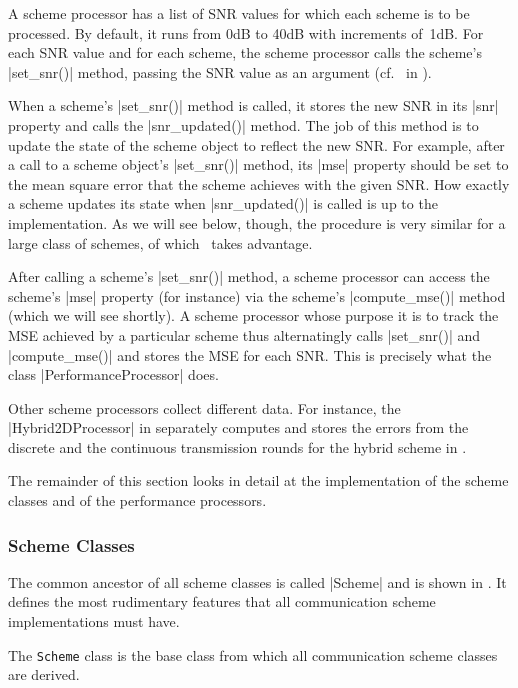 A scheme processor has a list of SNR values for which each scheme is to be
processed. By default, it runs from 0dB to 40dB with increments of~1dB. For
each SNR value and for each scheme, the scheme processor calls the scheme's
|set_snr()| method, passing the SNR value as an argument (cf.~ in
). 

When a scheme's |set_snr()| method is called, it stores the new SNR in its |snr|
property and calls the |snr_updated()| method. The job of this method is to
update the state of the scheme object to reflect the new SNR. For example, after
a call to a scheme object's |set_snr()| method, its |mse| property should be set
to the mean square error that the scheme achieves with the given SNR. How
exactly a scheme updates its state when |snr_updated()| is called is up to the
implementation. As we will see below, though, the procedure is very similar for
a large class of schemes, of which \jscsim\ takes advantage. 

After calling a scheme's |set_snr()| method, a scheme processor can access
the scheme's |mse| property (for instance) via the scheme's |compute_mse()|
method (which we will see shortly). A scheme processor whose purpose it is to
track the MSE achieved by a particular scheme thus alternatingly calls
|set_snr()| and |compute_mse()| and stores the MSE for each SNR. This is
precisely what the class |PerformanceProcessor| does. 

Other scheme processors collect different data. For instance, the
|Hybrid2DProcessor| in  separately computes and stores
the errors from the discrete and the continuous transmission rounds for the
hybrid scheme in .

The remainder of this section looks in detail at the implementation of the
scheme classes and of the performance processors.


\subsubsection{Scheme Classes}

The common ancestor of all scheme classes is called |Scheme| and is shown in
. It defines the most rudimentary features that all
communication scheme implementations must have. 

\begin{listing}
\caption{The \texttt{Scheme} class is the base class from which all
communication scheme classes are derived.}
\label{lst:schemeclass}
\end{listing}

